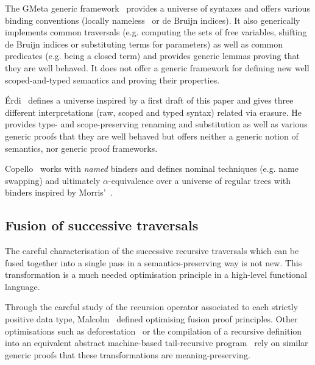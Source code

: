 The GMeta generic framework~\citeyear{gmeta} provides a universe of syntaxes
and offers various binding conventions (locally nameless~\cite{Chargueraud2012}
or de Bruijn indices). It also generically implements common traversals (e.g. computing
the sets of free variables,
shifting
de Bruijn indices or substituting terms for parameters) as well as common
predicates (e.g. being a closed term) and provides generic lemmas proving that
they are well behaved. It does not offer a generic framework
for defining new well scoped-and-typed semantics and proving their properties.

Érdi~\citeyear{gergodraft} defines a universe inspired by a first draft of this
paper and gives three different interpretations (raw, scoped and typed syntax)
related via erasure. He provides type- and scope-preserving renaming and
substitution as well as various generic proofs that they are well behaved but
offers neither a generic notion of semantics, nor generic proof frameworks.

Copello~\citeyear{copello2017} works with \emph{named} binders and
defines nominal techniques (e.g. name swapping) and ultimately $\alpha$-equivalence
over a universe of regular trees with binders inspired by Morris'~\citeyear{morris-regulartt}.

\subsection{Fusion of successive traversals}

The careful characterisation of the successive recursive traversals which can be
fused together into a single pass in a semantics-preserving way is not new. This
transformation is a much needed optimisation principle in a high-level functional
language.

Through the careful study of the recursion operator associated to each
strictly positive data type,
Malcolm~\citeyear{DBLP:journals/scp/Malcolm90} defined optimising
fusion proof principles.
%
Other optimisations such as deforestation~\cite{DBLP:journals/tcs/Wadler90}
or the compilation of a recursive definition into an equivalent abstract
machine-based tail-recursive program~\cite{DBLP:conf/icfp/CortinasS18}
rely on similar generic proofs that these transformations are meaning-preserving.




